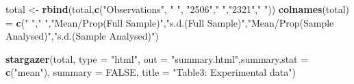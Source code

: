 \documentclass[]{article}
\newenvironment{Shaded}{\begin{snugshade}}{\end{snugshade}}
\newcommand{\KeywordTok}[1]{\textcolor[rgb]{0.13,0.29,0.53}{\textbf{#1}}}
\newcommand{\DataTypeTok}[1]{\textcolor[rgb]{0.13,0.29,0.53}{#1}}
\newcommand{\DecValTok}[1]{\textcolor[rgb]{0.00,0.00,0.81}{#1}}
\newcommand{\StringTok}[1]{\textcolor[rgb]{0.31,0.60,0.02}{#1}}
\newcommand{\OtherTok}[1]{\textcolor[rgb]{0.56,0.35,0.01}{#1}}
\newcommand{\OperatorTok}[1]{\textcolor[rgb]{0.81,0.36,0.00}{\textbf{#1}}}
\newcommand{\NormalTok}[1]{#1}
\begin{document}
\begin{Shaded}
\begin{Highlighting}[]
\NormalTok{total <-}\StringTok{ }\KeywordTok{rbind}\NormalTok{(total,}\KeywordTok{c}\NormalTok{(}\StringTok{"Observations"}\NormalTok{, }\StringTok{" "}\NormalTok{, }\StringTok{"2506"}\NormalTok{,}\StringTok{" "}\NormalTok{,}\StringTok{"2321"}\NormalTok{,}\StringTok{" "}\NormalTok{))}
\KeywordTok{colnames}\NormalTok{(total) =}\StringTok{  }\KeywordTok{c}\NormalTok{(}\StringTok{" "}\NormalTok{,}\StringTok{"  "}\NormalTok{,}\StringTok{"Mean/Prop(Full Sample)"}\NormalTok{,}\StringTok{"s.d.(Full Sample)"}\NormalTok{,}\StringTok{"Mean/Prop(Sample Analysed)"}\NormalTok{,}\StringTok{"s.d.(Sample Analysed)"}\NormalTok{)}
\end{Highlighting}
\end{Shaded}

\begin{Shaded}
\end{Shaded}

\begin{Shaded}
\begin{Highlighting}[]
\KeywordTok{stargazer}\NormalTok{(total, }\DataTypeTok{type =} \StringTok{"html"}\NormalTok{, }\DataTypeTok{out =} \StringTok{"summary.html"}\NormalTok{,}\DataTypeTok{summary.stat =} \KeywordTok{c}\NormalTok{(}\StringTok{"mean"}\NormalTok{), }\DataTypeTok{summary =} \OtherTok{FALSE}\NormalTok{, }\DataTypeTok{title =} \StringTok{"Table3: Experimental data"}\NormalTok{)}
\end{Highlighting}
\end{Shaded}
\end{document}
